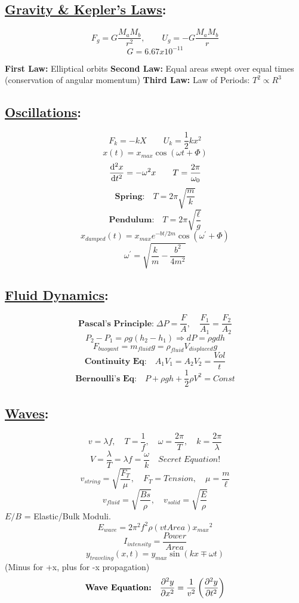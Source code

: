 \documentclass[fleqn]{article}
\begin{document}
\begin{multicols*}{3} %
\subsection*{ \centering \underline{Gravity \& Kepler's Laws}:}
\[ F_g = G \frac{M_a M_b}{r^2}, \qquad U_g = -G \frac{M_a M_b}{r}\]
\[ G = 6.67x10^{-11} \]
\raggedright
    {\textbf{First Law:} Elliptical orbits\linebreak
    \textbf{Second Law:} Equal areas swept over equal times (conservation of angular momentum)\linebreak
    \textbf{Third Law:} Law of Periods: \( T^2 \propto R^3 \)
    }

\subsection*{ \centering \underline{Oscillations}:}
\[ F_k = -kX \qquad U_k = \frac{1}{2}kx^2 \]
\[ x(t) = x_{max}\cos{(\omega t + \Phi)} \]
\[ \frac{\mathrm{d}^{2}{x}}{\mathrm{d}{t}^{2} } = -\omega^2x \qquad T = \frac{2\pi}{\omega_0} \]
\[ \textbf{Spring:} \quad T = 2\pi \sqrt{\frac{m}{k}} \]
\[ \textbf{Pendulum:} \quad T = 2\pi\sqrt{\frac{\ell}{g}} \]
\[ x_{damped}(t) = x_{max}e^{-bt/2m}\cos{(\omega^\prime + \Phi)} \]
\[ \omega^\prime = \sqrt{\frac{k}{m} - \frac{b^2}{4m^2}} \]

\subsection*{ \centering \underline{Fluid Dynamics}:}
\[ \textbf{Pascal's Principle:} \; \Delta P = \frac{F}{A}, \quad\frac{F_1}{A_1} = \frac{F_2}{A_2} \]
\[ P_2 - P_1 = \rho g(h_2 - h_1) \Rightarrow dP = \rho gdh \]
\[ F_{buoyant} = m_{fluid}g = \rho_{fluid}V_{displaced}g \]
\[ \textbf{Continuity Eq:} \quad A_1V_1 = A_2V_2 = \frac{Vol}{t} \]
\[ \textbf{Bernoulli's Eq:} \quad P + \rho gh + \frac{1}{2}\rho V^2 = Const\]

\subsection*{ \centering \underline{Waves}:}
\[ v = \lambda f, \quad T = \frac{1}{f}, \quad \omega = \frac{2\pi}{T}, \quad k = \frac{2\pi}{\lambda} \]
\[ V = \frac{\lambda}{T} = \lambda f = \boxed{\frac{\omega}{k}} \quad Secret \; Equation!\]
\[ v_{string} = \sqrt{\frac{F_T}{\mu}}, \quad F_T = Tension, \quad \mu = \frac{m}{\ell} \]
\[ v_{fluid} = \sqrt{\frac{Bs}{\rho}}, \quad v_{solid} = \sqrt{\frac{E}{\rho}} \]
\(E/B\) = Elastic/Bulk Moduli.\linebreak
\[ E_{wave} = 2\pi^2 f^2 \rho (vtArea) {x_{max}}^2 \]
\[ I_{intensity} = \frac{Power}{Area} \]
\[ y_{traveling}(x,t) = y_{max}\sin{(kx \mp \omega t)} \]
(Minus for +x, plus for -x propagation)
\[ \textbf{Wave Equation:} \quad \frac{\partial^{2}{y}}{\partial{x}^{2} } = \frac{1}{v^2}\left(\frac{\partial^{2}{y}}{\partial{t}^{2} }\right) \]


\end{multicols*}
\end{document}
